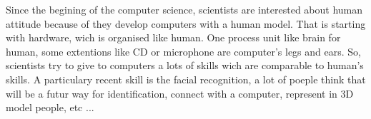 Since the begining of the computer science, scientists are interested 
about human attitude because of they develop computers with a human model.
That is starting with hardware, wich is organised like human. One 
process unit like brain for human, some extentions like CD or microphone are 
computer's legs and ears.
So, scientists try to give to computers a lots of skills wich are 
comparable to human's skills. A particulary recent skill is the facial 
recognition, a lot of poeple think that will be a futur way for identification, connect with a computer, represent in 3D model people, etc ...
